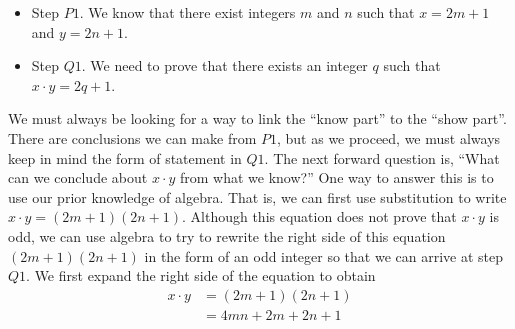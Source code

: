 \begin{itemize}
  \item Step $P1$.  We know that there exist integers $m$ and $n$ such that $x = 2m + 1$ and $y = 2n + 1$.
  \item Step $Q1$.  We need to prove that there exists an integer $q$ such that \\$x \cdot y = 2q + 1$.
\end{itemize}
%
We must always be looking for a way to link the ``know part'' to the ``show part''.  There are conclusions we can make from $P1$, but as we proceed, we must always keep in mind the form of statement in $Q1$.  The next forward question is, ``What can we conclude about  $x \cdot y$  from what we know?''  One way to answer this is to use our prior knowledge of algebra.  That is, we can first use substitution to write  $x \cdot y = \left( {2m + 1} \right)\left( {2n + 1} \right)$.  Although this equation does not prove that $x \cdot y$ is odd, we can use algebra to try to rewrite the right side of this equation 
$\left( {2m + 1} \right)\left( {2n + 1} \right)$ in the form of an odd integer so that we can arrive at 
step $Q1$.  We first expand the right side of the equation to obtain
\begin{align*}
x \cdot y &= (2m + 1)(2n + 1) \\
          &= 4mn + 2m + 2n + 1
\end{align*}
